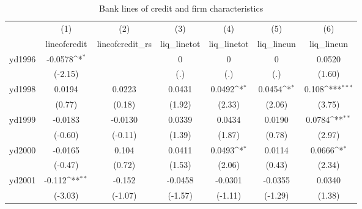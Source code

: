 \begin{table}[htbp]\centering
\def\sym#1{\ifmmode^{#1}\else\(^{#1}\)\fi}
\caption{Bank lines of credit and firm characteristics\label{tab3}}
\begin{tabular}{l*{6}{c}}
\hline\hline
            &\multicolumn{1}{c}{(1)}&\multicolumn{1}{c}{(2)}&\multicolumn{1}{c}{(3)}&\multicolumn{1}{c}{(4)}&\multicolumn{1}{c}{(5)}&\multicolumn{1}{c}{(6)}\\
            &\multicolumn{1}{c}{lineofcredit}&\multicolumn{1}{c}{lineofcredit\_rs}&\multicolumn{1}{c}{liq\_linetot}&\multicolumn{1}{c}{liq\_linetot}&\multicolumn{1}{c}{liq\_lineun}&\multicolumn{1}{c}{liq\_lineun}\\
\hline
yd1996      &     -0.0578\sym{*}  &                     &           0         &           0         &           0         &      0.0520         \\
            &     (-2.15)         &                     &         (.)         &         (.)         &         (.)         &      (1.60)         \\
[1em]
yd1998      &      0.0194         &      0.0223         &      0.0431         &      0.0492\sym{*}  &      0.0454\sym{*}  &       0.108\sym{***}\\
            &      (0.77)         &      (0.18)         &      (1.92)         &      (2.33)         &      (2.06)         &      (3.75)         \\
[1em]
yd1999      &     -0.0183         &     -0.0130         &      0.0339         &      0.0434         &      0.0190         &      0.0784\sym{**} \\
            &     (-0.60)         &     (-0.11)         &      (1.39)         &      (1.87)         &      (0.78)         &      (2.97)         \\
[1em]
yd2000      &     -0.0165         &       0.104         &      0.0411         &      0.0493\sym{*}  &      0.0114         &      0.0666\sym{*}  \\
            &     (-0.47)         &      (0.72)         &      (1.53)         &      (2.06)         &      (0.43)         &      (2.34)         \\
[1em]
yd2001      &      -0.112\sym{**} &      -0.152         &     -0.0458         &     -0.0301         &     -0.0355         &      0.0340         \\
            &     (-3.03)         &     (-1.07)         &     (-1.57)         &     (-1.11)         &     (-1.29)         &      (1.38)         \\

\end{tabular}
\end{table}
